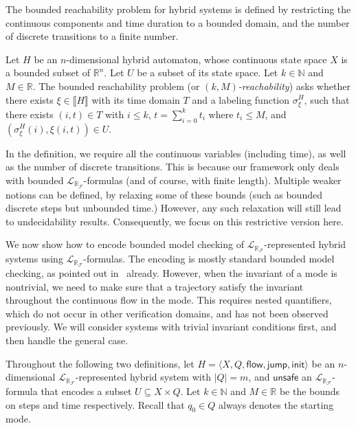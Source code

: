 \documentclass[envcountsect]{llncs}
\newcommand{\flow}{\mathsf{flow}}
\newcommand{\jump}{\mathsf{jump}}
\newcommand{\init}{\mathsf{init}}
\newcommand{\unsafe}{\mathsf{unsafe}}
\newcommand{\lrf}{\mathcal{L}_{\mathbb{R}_{\mathcal{F}}}}
\begin{document}
The bounded reachability problem for hybrid systems is defined by restricting
the continuous components and time duration to a bounded domain, and the number
of discrete transitions to a finite number. 
\begin{definition}
Let $H$ be an $n$-dimensional hybrid automaton, whose continuous state space
$X$ is a bounded subset of $\mathbb{R}^n$. Let $U$ be a subset of its state
space. Let $k\in \mathbb{N}$ and $M \in \mathbb{R}$. The {bounded
reachability problem} (or {\em $(k,M)$-reachability}) asks whether there exists
$\xi\in\llbracket H \rrbracket$ with its time domain $T$ and a labeling function
$\sigma_{\xi}^H$, such that there exists $(i,t)\in T$ with $i\leq k$, $t=
\sum_{i=0}^k t_i$ where $t_i \leq M$, and $(\sigma^H_{\xi}(i), \xi(i,t))\in U.$ 
\end{definition}
\begin{remark}
In the definition, we require all the continuous variables (including
time), as well as the number of discrete transitions. This is because our
framework only deals with bounded $\lrf$-formulas (and of course, with finite
length). Multiple weaker notions can be defined, by relaxing some of these
bounds (such as bounded discrete steps but unbounded time.) However, any such
relaxation will still lead to undecidability results. Consequently, we focus on
this restrictive version here. 
\end{remark}

We now show how to encode bounded model checking of
$\lrf$-represented hybrid systems using $\lrf$-formulas. The encoding is mostly
standard bounded model checking, as pointed out in~\cite{} already. However,
when the invariant of a mode is nontrivial, we need to make sure that a
trajectory satisfy the invariant throughout the continuous flow in the mode.
This requires nested quantifiers, which do not occur in other verification
domains, and has not been observed previously. We will consider systems with
trivial invariant conditions first, and then handle the general case.

Throughout the following two definitions, let $H = \langle X, Q, \flow,
\jump,\init\rangle$ be an $n$-dimensional $\lrf$-represented hybrid system with
$|Q|=m$, and $\unsafe$ an $\lrf$-formula that encodes a subset $U\subseteq
X\times Q$. Let $k\in \mathbb{N}$ and $M\in \mathbb{R}$ be the bounds on steps
and time respectively. Recall that $q_0\in Q$ always denotes the starting mode. 
\end{document}
